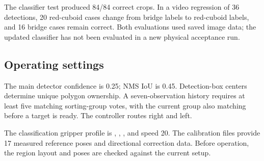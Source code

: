 The classifier test produced 84/84 correct crops. In a video regression of 36 detections, 20 red-cuboid cases change from bridge labels to red-cuboid labels, and 16 bridge cases remain correct. Both evaluations used saved image data; the updated classifier has not been evaluated in a new physical acceptance run.

\subsection{Operating settings}
The main detector confidence is 0.25; NMS IoU is 0.45. Detection-box centers determine unique polygon ownership. A seven-observation history requires at least five matching sorting-group votes, with the current group also matching before a target is ready. The controller routes  right and  left.

The classification gripper profile is , , , and speed 20. The calibration files provide 17 measured reference poses and directional correction data. Before operation, the region layout and poses are checked against the current setup.

